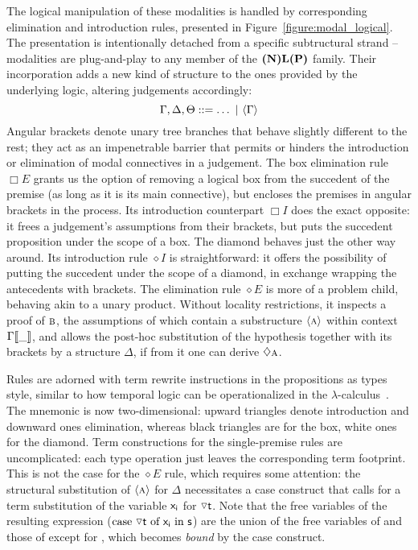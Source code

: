 The logical manipulation of these modalities is handled by corresponding elimination and introduction rules, presented in Figure~\ref{figure:modal_logical}.
The presentation is intentionally detached from a specific subtructural strand -- modalities are plug-and-play to any member of the $\textbf{(N)L(P)}$ family.
Their incorporation adds a new kind of structure to the ones provided by the underlying logic, altering judgements accordingly:
\[
	\Gamma, \Delta, \Theta ::= \dots \ | \ \bracket{\Gamma}
\]
Angular brackets denote unary tree branches that behave slightly different to the rest; they act as an impenetrable barrier that permits or hinders the introduction or elimination of modal connectives in a judgement.
The box elimination rule $\Box E$ grants us the option of removing a logical box from the succedent of the premise (as long as it is its main connective), but encloses the premises in angular brackets in the process.
Its introduction counterpart $\Box I$ does the exact opposite: it frees a judgement's assumptions from their brackets, but puts the succedent proposition under the scope of a box.
The diamond behaves just the other way around.
Its introduction rule $\diamond I$ is straightforward: it offers the possibility of putting the succedent under the scope of a diamond, in exchange wrapping the antecedents with brackets.
The elimination rule $\diamond E$ is more of a problem child, behaving akin to a unary product.
Without locality restrictions, it inspects a proof of $\smallprop{B}$, the assumptions of which contain a substructure $\bracket{\smallprop{A}}$ within context $\Gamma{\llbracket{\_}\rrbracket}$, and allows the post-hoc substitution of the hypothesis together with its brackets by a structure $\Delta$, if from it one can derive $\diamond \smallprop{A}$.

Rules are adorned with term rewrite instructions in the propositions as types style, similar to how temporal logic can be operationalized in the $\lambda$-calculus~\cite{wansing2002sequent}.
The mnemonic is now two-dimensional: upward triangles denote introduction and downward ones elimination, whereas black triangles are for the box, white ones for the diamond.
Term constructions for the single-premise rules are uncomplicated: each type operation just leaves the corresponding term footprint.
This is not the case for the $\diamond E$ rule, which requires some attention:
the structural substitution of $\bracket{\smallprop{A}}$ for $\Delta$ necessitates a case construct that calls for a term substitution of the variable $\mathsf{x_i}$ for $\diaelim\smallterm{t}$.
Note that the free variables of the resulting expression ($\caseof{\diaelim t}{x_i}{s}$) are the union of the free variables of  and those of  except for , which becomes \textit{bound} by the case construct.


